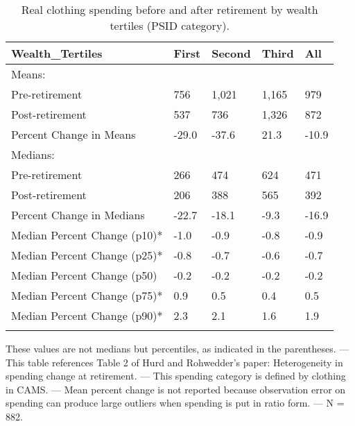 \begin{table}[tbp] \centering
{}

\caption{Real clothing spending before and after retirement by wealth tertiles (PSID category).}
\begin{tabularx}{\textwidth}{lCCCC}

\toprule
{Wealth\_Tertiles}&{First}&{Second}&{Third}&{All} \tabularnewline
\midrule\addlinespace[1.5ex]
Means:&&&& \tabularnewline
\midrule Pre-retirement&756&1,021&1,165&979 \tabularnewline
Post-retirement&537&736&1,326&872 \tabularnewline
Percent Change in Means&-29.0&-37.6&21.3&-10.9 \tabularnewline
\midrule Medians:&&&& \tabularnewline
\midrule Pre-retirement&266&474&624&471 \tabularnewline
Post-retirement&206&388&565&392 \tabularnewline
Percent Change in Medians&-22.7&-18.1&-9.3&-16.9 \tabularnewline
Median Percent Change (p10)*&-1.0&-0.9&-0.8&-0.9 \tabularnewline
Median Percent Change (p25)*&-0.8&-0.7&-0.6&-0.7 \tabularnewline
Median Percent Change (p50)&-0.2&-0.2&-0.2&-0.2 \tabularnewline
Median Percent Change (p75)*&0.9&0.5&0.4&0.5 \tabularnewline
Median Percent Change (p90)*&2.3&2.1&1.6&1.9 \tabularnewline
\bottomrule \addlinespace[1.5ex]

\end{tabularx}
\begin{flushleft}
\footnotesize *These values are not medians but percentiles, as indicated in the parentheses. \linebreak --- \linebreak This table references Table 2 of Hurd and Rohwedder's paper: Heterogeneity in spending change at retirement. \linebreak --- \linebreak This spending category is defined by clothing in CAMS. \linebreak --- \linebreak Mean percent change is not reported because observation error on spending can produce large outliers when spending is put in ratio form. \linebreak --- \linebreak N = 882.
\end{flushleft}
\end{table}
